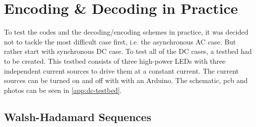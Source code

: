 
\section{Encoding \& Decoding in Practice}
\label{sec:enc-dec-practice}

	To test the codes and the decoding/encoding schemes in practice, it was decided not to tackle the most difficult case first, i.e. the asynchronous AC case.
	But rather start with synchronous DC case.
	To test all of the DC cases, a testbed had to be created.
	This testbed consists of three high-power LEDs with three independent current sources to drive them at a constant current.
	The current sources can be turned on and off with with an Arduino.
	The schematic, pcb and photos can be seen in \autoref{app:dc-testbed}.

	\subsection{Walsh-Hadamard Sequences}

